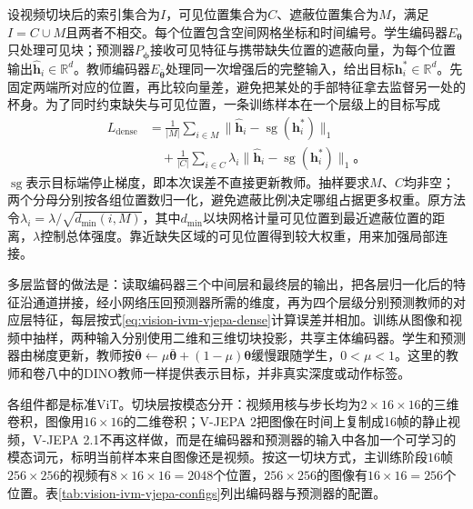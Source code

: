 设视频切块后的索引集合为$I$，可见位置集合为$C$、遮蔽位置集合为$M$，满足$I=C\cup M$且两者不相交。每个位置包含空间网格坐标和时间编号。学生编码器$E_{\bm\theta}$只处理可见块；预测器$P_{\bm\phi}$接收可见特征与携带缺失位置的遮蔽向量，为每个位置输出$\widehat{\bm{h}}_i\in\mathbb{R}^{d}$。教师编码器$E_{\bar{\bm\theta}}$处理同一次增强后的完整输入，给出目标$\bm{h}^{*}_i\in\mathbb{R}^{d}$。先固定两端所对应的位置，再比较向量差，避免把某处的手部特征拿去监督另一处的杯身。为了同时约束缺失与可见位置，一条训练样本在一个层级上的目标写成
\begin{equation}
 \begin{aligned}
  L_{\mathrm{dense}}
  &=\frac{1}{|M|}\sum_{i\in M}
    \lVert\widehat{\bm{h}}_i-\operatorname{sg}(\bm{h}^{*}_i)\rVert_1
   \\
  &\quad+\frac{1}{|C|}\sum_{i\in C}\lambda_i
    \lVert\widehat{\bm{h}}_i-\operatorname{sg}(\bm{h}^{*}_i)\rVert_1\text{。}
 \end{aligned}
  \label{eq:vision-ivm-vjepa-dense}
\end{equation}
$\operatorname{sg}$表示目标端停止梯度，即本次误差不直接更新教师。抽样要求$M$、$C$均非空；两个分母分别按各组位置数归一化，避免遮蔽比例决定哪组占据更多权重。原方法令$\lambda_i=\lambda/\sqrt{d_{\min}(i,M)}$，其中$d_{\min}$以块网格计量可见位置到最近遮蔽位置的距离，$\lambda$控制总体强度。靠近缺失区域的可见位置得到较大权重，用来加强局部连接。

多层监督的做法是：读取编码器三个中间层和最终层的输出，把各层归一化后的特征沿通道拼接，经小网络压回预测器所需的维度，再为四个层级分别预测教师的对应层特征，每层按式\eqref{eq:vision-ivm-vjepa-dense}计算误差并相加。训练从图像和视频中抽样，两种输入分别使用二维和三维切块投影，共享主体编码器。学生和预测器由梯度更新，教师按$\bar{\bm\theta}\leftarrow\mu\bar{\bm\theta}+(1-\mu)\bm\theta$缓慢跟随学生，$0<\mu<1$。这里的教师和卷八中的DINO教师一样提供表示目标，并非真实深度或动作标签。

各组件都是标准ViT。切块层按模态分开：视频用核与步长均为$2\times16\times16$的三维卷积，图像用$16\times16$的二维卷积；V-JEPA 2把图像在时间上复制成16帧的静止视频，V-JEPA 2.1不再这样做，而是在编码器和预测器的输入中各加一个可学习的模态词元，标明当前样本来自图像还是视频。按这一切块方式，主训练阶段$16$帧$256\times256$的视频有$8\times16\times16=2048$个位置，$256\times256$的图像有$16\times16=256$个位置。表\ref{tab:vision-ivm-vjepa-configs}列出编码器与预测器的配置。


